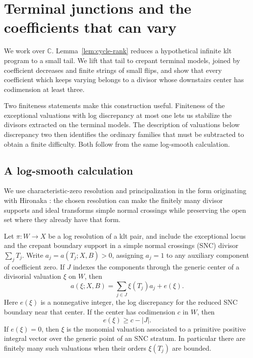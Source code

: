 \section{Terminal junctions and the coefficients that can vary}
\label{sec:terminal}

We work over $\mathbb C$.  Lemma~\ref{lem:cycle-rank} reduces a
hypothetical infinite klt program to a small tail.  We lift that tail
to crepant terminal models, joined by coefficient decreases and finite
strings of small flips, and show that every coefficient which keeps
varying belongs to a divisor whose downstairs center has codimension
at least three.

Two finiteness statements make this construction useful.  Finiteness of
the exceptional valuations with log discrepancy at most one lets us
stabilize the divisors extracted on the terminal models.  The description
of valuations below discrepancy two then identifies the ordinary
families that must be subtracted to obtain a finite difficulty.  Both
follow from the same log-smooth calculation.

\subsection{A log-smooth calculation}

We use characteristic-zero resolution and principalization in the
form originating with Hironaka \cite{Hironaka1964I,Hironaka1964II}:
the chosen resolution can make the finitely many divisor supports
and ideal transforms simple normal crossings while preserving the
open set where they already have that form.

\begin{lemma}\label{lem:snc-valuations}
Let $\pi:W\to X$ be a log resolution of a klt pair, and include the exceptional locus and the crepant boundary support in a simple normal crossings (SNC) divisor $\sum_jT_j$. Write $a_j=a(T_j;X,B)>0$, assigning $a_j=1$ to any auxiliary component of coefficient zero. If $J$ indexes the components through the generic center of a divisorial valuation $\xi$ on $W$, then
\begin{equation}\label{eq:snc-formula}
 a(\xi;X,B)=\sum_{j\in J}\xi(T_j)a_j+e(\xi).
\end{equation}
Here $e(\xi)$ is a nonnegative integer, the log discrepancy for the reduced SNC boundary near that center. If the center has codimension $c$ in $W$, then
\[
 e(\xi)\geq c-|J|.
\]
If $e(\xi)=0$, then $\xi$ is the monomial valuation associated to a primitive positive integral vector over the generic point of an SNC stratum. In particular there are finitely many such valuations when their orders $\xi(T_j)$ are bounded.
\end{lemma}


